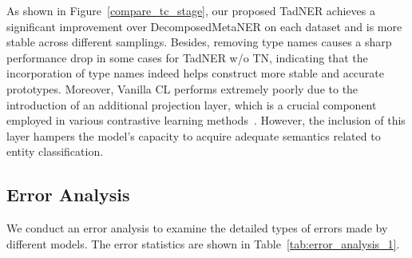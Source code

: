 \documentclass[11pt]{article}
\newcommand{\ours}{{TadNER}\xspace}
\begin{document}
As shown in Figure~\ref{compare_tc_stage}, our proposed \ours achieves a significant improvement over DecomposedMetaNER on each dataset and is more stable across different samplings.
Besides, removing type names causes a sharp performance drop in some cases for \ours w/o TN, indicating that the incorporation of type names indeed helps construct more stable and accurate prototypes.
Moreover, Vanilla CL performs extremely poorly due to the introduction of an additional projection layer, which is a crucial component employed in various contrastive learning methods~\cite{pmlr-v119-chen20j,das-etal-2022-container}.
However, the inclusion of this layer hampers the model's capacity to acquire adequate semantics related to entity classification.


\subsection{Error Analysis}

We conduct an error analysis to examine the detailed types of errors made by different models.
The error statistics are shown in Table~\ref{tab:error_analysis_1}.
\end{document}
